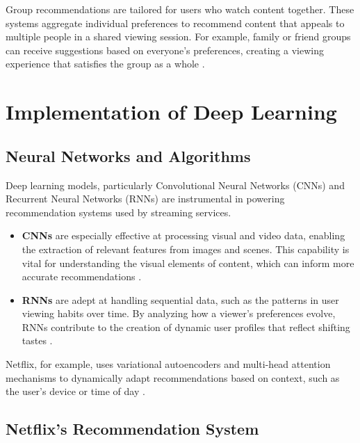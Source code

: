 \documentclass[12pt,english,a4paper]{article}
\begin{document}
\hspace*{2em}Group recommendations are tailored for users who watch content together. These systems aggregate individual preferences to recommend content that appeals to multiple people in a shared viewing session. For example, family or friend groups can receive suggestions based on everyone’s preferences, creating a viewing experience that satisfies the group as a whole \cite{Lubos2023}.

\section{Implementation of Deep Learning}

\subsection{Neural Networks and Algorithms}

\hspace*{2em}Deep learning models, particularly Convolutional Neural Networks (CNNs) and Recurrent Neural Networks (RNNs) are instrumental in powering recommendation systems used by streaming services.

\begin{itemize}
    \item \textbf{CNNs} are especially effective at processing visual and video data, enabling the extraction of relevant features from images and scenes. This capability is vital for understanding the visual elements of content, which can inform more accurate recommendations \cite{Hande2023,Alzubaidi2021}.

    \item \textbf{RNNs} are adept at handling sequential data, such as the patterns in user viewing habits over time. By analyzing how a viewer's preferences evolve, RNNs contribute to the creation of dynamic user profiles that reflect shifting tastes \cite{Alzubaidi2021}.

\end{itemize}
Netflix, for example, uses variational autoencoders and multi-head attention mechanisms to dynamically adapt recommendations based on context, such as the user’s device or time of day \cite{Gomez-Uribe2015,Jayalakshmi2022}.

\subsection{Netflix’s Recommendation System}
\end{document}
